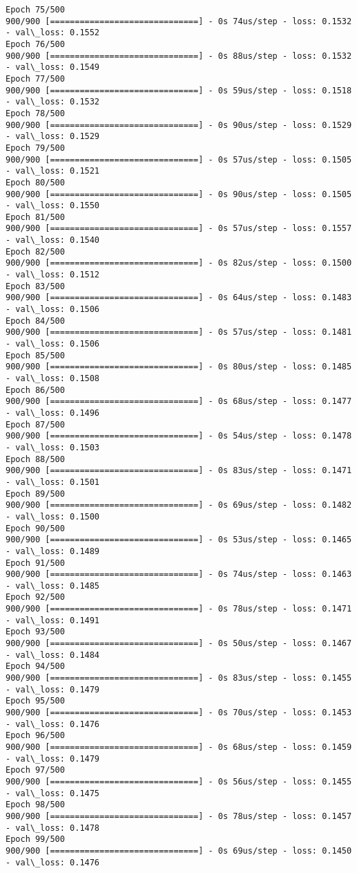 \documentclass[11pt]{article}
\begin{document}
\begin{Verbatim}[commandchars=\\\{\}]
Epoch 75/500
900/900 [==============================] - 0s 74us/step - loss: 0.1532 - val\_loss: 0.1552
Epoch 76/500
900/900 [==============================] - 0s 88us/step - loss: 0.1532 - val\_loss: 0.1549
Epoch 77/500
900/900 [==============================] - 0s 59us/step - loss: 0.1518 - val\_loss: 0.1532
Epoch 78/500
900/900 [==============================] - 0s 90us/step - loss: 0.1529 - val\_loss: 0.1529
Epoch 79/500
900/900 [==============================] - 0s 57us/step - loss: 0.1505 - val\_loss: 0.1521
Epoch 80/500
900/900 [==============================] - 0s 90us/step - loss: 0.1505 - val\_loss: 0.1550
Epoch 81/500
900/900 [==============================] - 0s 57us/step - loss: 0.1557 - val\_loss: 0.1540
Epoch 82/500
900/900 [==============================] - 0s 82us/step - loss: 0.1500 - val\_loss: 0.1512
Epoch 83/500
900/900 [==============================] - 0s 64us/step - loss: 0.1483 - val\_loss: 0.1506
Epoch 84/500
900/900 [==============================] - 0s 57us/step - loss: 0.1481 - val\_loss: 0.1506
Epoch 85/500
900/900 [==============================] - 0s 80us/step - loss: 0.1485 - val\_loss: 0.1508
Epoch 86/500
900/900 [==============================] - 0s 68us/step - loss: 0.1477 - val\_loss: 0.1496
Epoch 87/500
900/900 [==============================] - 0s 54us/step - loss: 0.1478 - val\_loss: 0.1503
Epoch 88/500
900/900 [==============================] - 0s 83us/step - loss: 0.1471 - val\_loss: 0.1501
Epoch 89/500
900/900 [==============================] - 0s 69us/step - loss: 0.1482 - val\_loss: 0.1500
Epoch 90/500
900/900 [==============================] - 0s 53us/step - loss: 0.1465 - val\_loss: 0.1489
Epoch 91/500
900/900 [==============================] - 0s 74us/step - loss: 0.1463 - val\_loss: 0.1485
Epoch 92/500
900/900 [==============================] - 0s 78us/step - loss: 0.1471 - val\_loss: 0.1491
Epoch 93/500
900/900 [==============================] - 0s 50us/step - loss: 0.1467 - val\_loss: 0.1484
Epoch 94/500
900/900 [==============================] - 0s 83us/step - loss: 0.1455 - val\_loss: 0.1479
Epoch 95/500
900/900 [==============================] - 0s 70us/step - loss: 0.1453 - val\_loss: 0.1476
Epoch 96/500
900/900 [==============================] - 0s 68us/step - loss: 0.1459 - val\_loss: 0.1479
Epoch 97/500
900/900 [==============================] - 0s 56us/step - loss: 0.1455 - val\_loss: 0.1475
Epoch 98/500
900/900 [==============================] - 0s 78us/step - loss: 0.1457 - val\_loss: 0.1478
Epoch 99/500
900/900 [==============================] - 0s 69us/step - loss: 0.1450 - val\_loss: 0.1476

\end{Verbatim}
\end{document}
